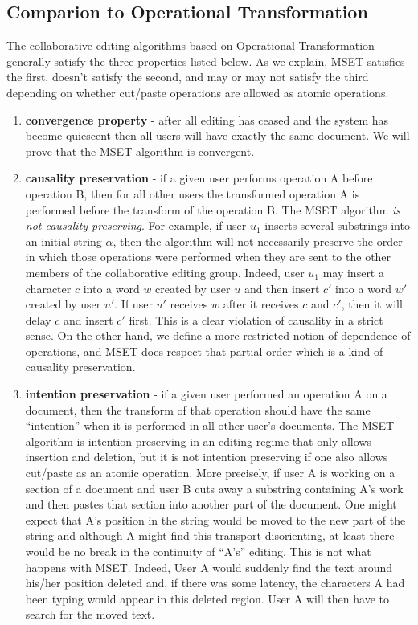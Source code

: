 \documentclass{amsart}
\begin{document}
\subsection{Comparion to Operational Transformation}
The collaborative editing algorithms based on Operational Transformation generally satisfy the three properties listed below.
As we explain, MSET satisfies the first, doesn't satisfy the second, and may or may not satisfy the third depending on whether
cut/paste operations are allowed as atomic operations.
\begin{enumerate}
\item {\bf convergence property} - after all editing has ceased and the system has become quiescent then all users will
have exactly the same document.  We will prove that the MSET algorithm is convergent. 
\item {\bf causality preservation} - if a given user performs operation A before operation B, then for all other users
the transformed operation A is performed before the transform of the operation B.  The MSET algorithm 
{\it is not causality preserving}. 
For example, if user $u_1$ inserts several
substrings into an initial string $\alpha$, then the algorithm will not necessarily preserve the order in which those operations
were performed when they are sent to the other members of the collaborative editing group. Indeed, user $u_1$ may insert a character $c$ into a word $w$ created by user $u$ and then insert $c'$ into a word $w'$ created by user $u'$.  If user $u'$ receives $w$ after it receives $c$ and $c'$, then it will delay $c$ and insert $c'$ first.  This is a clear violation of causality in a strict sense.  On the other hand, we define a more restricted notion of dependence of operations, and MSET does respect that partial order which is a kind of causality preservation.
\item {\bf intention preservation} - if a given user performed an operation A on a document, then the transform of that operation
should have the same ``intention'' when it is performed in all other user's documents. 
The MSET algorithm is intention preserving in an editing regime that only allows insertion and
deletion, but it is not intention preserving if one also allows cut/paste as an atomic operation. More precisely, if user A is working
on a section of a document and user B cuts away a substring containing A's work and then pastes that section into another part
of the document. One might expect that A's position in the string would be moved to the new part of the string and although 
A might find this transport disorienting, at least there would be no break in the continuity of ``A's'' editing.  
This is not what happens with MSET.
Indeed, User A would suddenly find the text around his/her position deleted and, if there was some latency, 
the characters A had been typing would appear in this deleted region. User A will then have to search for the moved text.
\end{enumerate}
\end{document}

